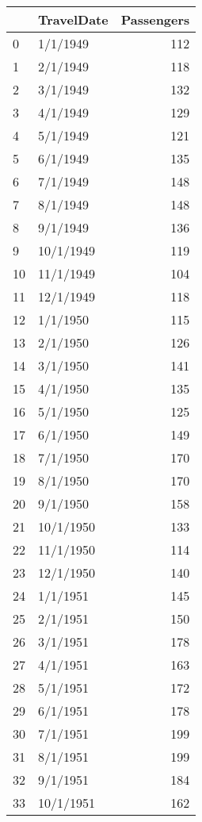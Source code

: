 \begin{tabular}{llr}
\toprule
{} & TravelDate &  Passengers \\
\midrule
0   &   1/1/1949 &         112 \\
1   &   2/1/1949 &         118 \\
2   &   3/1/1949 &         132 \\
3   &   4/1/1949 &         129 \\
4   &   5/1/1949 &         121 \\
5   &   6/1/1949 &         135 \\
6   &   7/1/1949 &         148 \\
7   &   8/1/1949 &         148 \\
8   &   9/1/1949 &         136 \\
9   &  10/1/1949 &         119 \\
10  &  11/1/1949 &         104 \\
11  &  12/1/1949 &         118 \\
12  &   1/1/1950 &         115 \\
13  &   2/1/1950 &         126 \\
14  &   3/1/1950 &         141 \\
15  &   4/1/1950 &         135 \\
16  &   5/1/1950 &         125 \\
17  &   6/1/1950 &         149 \\
18  &   7/1/1950 &         170 \\
19  &   8/1/1950 &         170 \\
20  &   9/1/1950 &         158 \\
21  &  10/1/1950 &         133 \\
22  &  11/1/1950 &         114 \\
23  &  12/1/1950 &         140 \\
24  &   1/1/1951 &         145 \\
25  &   2/1/1951 &         150 \\
26  &   3/1/1951 &         178 \\
27  &   4/1/1951 &         163 \\
28  &   5/1/1951 &         172 \\
29  &   6/1/1951 &         178 \\
30  &   7/1/1951 &         199 \\
31  &   8/1/1951 &         199 \\
32  &   9/1/1951 &         184 \\
33  &  10/1/1951 &         162 \\

\end{tabular}
